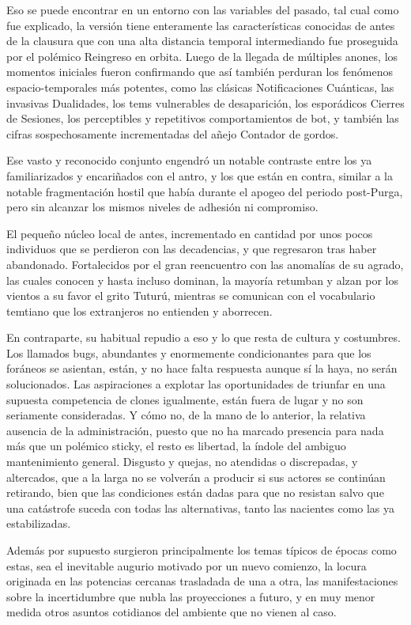 \documentclass[
]{book}
\begin{document}
Eso se puede encontrar en un entorno con las variables del pasado, tal cual como fue explicado, la versión tiene enteramente las características conocidas de antes de la clausura que con una alta distancia temporal intermediando fue proseguida por el polémico Reingreso en orbita. Luego de la llegada de múltiples anones, los momentos iniciales fueron confirmando que así también perduran los fenómenos espacio-temporales más potentes, como las clásicas Notificaciones Cuánticas, las invasivas Dualidades, los tems vulnerables de desaparición, los esporádicos Cierres de Sesiones, los perceptibles y repetitivos comportamientos de bot, y también las cifras sospechosamente incrementadas del añejo Contador de gordos.

Ese vasto y reconocido conjunto engendró un notable contraste entre los ya familiarizados y encariñados con el antro, y los que están en contra, similar a la notable fragmentación hostil que había durante el apogeo del periodo post-Purga, pero sin alcanzar los mismos niveles de adhesión ni compromiso.

El pequeño núcleo local de antes, incrementado en cantidad por unos pocos individuos que se perdieron con las decadencias, y que regresaron tras haber abandonado. Fortalecidos por el gran reencuentro con las anomalías de su agrado, las cuales conocen y hasta incluso dominan, la mayoría retumban y alzan por los vientos a su favor el grito Tuturú, mientras se comunican con el vocabulario temtiano que los extranjeros no entienden y aborrecen.

En contraparte, su habitual repudio a eso y lo que resta de cultura y costumbres. Los llamados bugs, abundantes y enormemente condicionantes para que los foráneos se asientan, están, y no hace falta respuesta aunque sí la haya, no serán solucionados. Las aspiraciones a explotar las oportunidades de triunfar en una supuesta competencia de clones igualmente, están fuera de lugar y no son seriamente consideradas. Y cómo no, de la mano de lo anterior, la relativa ausencia de la administración, puesto que no ha marcado presencia para nada más que un polémico sticky, el resto es libertad, la índole del ambiguo mantenimiento general. Disgusto y quejas, no atendidas o discrepadas, y altercados, que a la larga no se volverán a producir si sus actores se continúan retirando, bien que las condiciones están dadas para que no resistan salvo que una catástrofe suceda con todas las alternativas, tanto las nacientes como las ya estabilizadas.

Además por supuesto surgieron principalmente los temas típicos de épocas como estas, sea el inevitable augurio motivado por un nuevo comienzo, la locura originada en las potencias cercanas trasladada de una a otra, las manifestaciones sobre la incertidumbre que nubla las proyecciones a futuro, y en muy menor medida otros asuntos cotidianos del ambiente que no vienen al caso.
\end{document}

